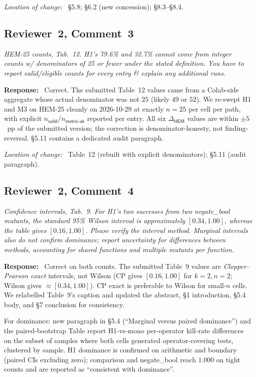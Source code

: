\documentclass[11pt,a4paper]{article}
\newenvironment{reviewerquote}
  {\begin{tcolorbox}[colback=black!5, colframe=black!15, boxrule=0.3pt,
                     arc=1pt, left=6pt, right=6pt, top=3pt, bottom=3pt,
                     breakable]\itshape\small}
  {\end{tcolorbox}}
\newcommand{\rcomment}[2]{\subsection*{Reviewer~#1, Comment~#2}}
\newcommand{\response}{\noindent\textbf{Response:}\ }
\newcommand{\loc}{\par\smallskip\noindent\textit{Location of change:}\ }
\begin{document}
\loc{} \S5.8; \S6.2 (new concession); \S8.3--\S8.4.

\rcomment{2}{3}

\begin{reviewerquote}
HEM-25 counts, Tab.\ 12. H1's 79.6\% and 32.7\% cannot come from integer counts w/ denominators of 25 or fewer under the stated definition. You have to report valid/eligible counts for every entry \& explain any additional runs.
\end{reviewerquote}

\response{}
Correct. The submitted Table~12 values came from a Colab-side aggregate whose actual denominator was not $25$ (likely $49$ or $52$). We re-swept H1 and M3 on HEM-25 cleanly on 2026-10-29 at exactly $n = 25$ per cell per path, with explicit $n_{\textsf{valid}} / n_{\textsf{metric-ok}}$ reported per entry. All six $\Delta_{\textsf{HEM}}$ values are within $\pm 5$~pp of the submitted version; the correction is denominator-honesty, not finding-reversal. \S5.11 contains a dedicated audit paragraph.

\loc{} Table~12 (rebuilt with explicit denominators); \S5.11 (audit paragraph).

\rcomment{2}{4}

\begin{reviewerquote}
Confidence intervals, Tab.\ 9. For H1's two successes from two negate\_bool mutants, the standard 95\% Wilson interval is approximately $[0.34, 1.00]$, whereas the table gives $[0.16, 1.00]$. Please verify the interval method. Marginal intervals also do not confirm dominance; report uncertainty for differences between methods, accounting for shared functions and multiple mutants per function.
\end{reviewerquote}

\response{}
Correct on both counts. The submitted Table~9 values are \emph{Clopper--Pearson exact} intervals, not Wilson (CP gives $[0.16, 1.00]$ for $k = 2, n = 2$; Wilson gives $\approx [0.34, 1.00]$). CP exact is preferable to Wilson for small-$n$ cells. We relabelled Table~9's caption and updated the abstract, \S1 introduction, \S5.4 body, and \S7 conclusion for consistency.

For dominance: new paragraph in \S5.4 (``Marginal versus paired dominance'') and the paired-bootstrap Table report H1-vs-mono per-operator kill-rate differences on the subset of samples where both cells generated operator-covering tests, clustered by sample. H1 dominance is confirmed on arithmetic and boundary (paired CIs excluding zero); comparison and negate\_bool reach $1.000$ on tight counts and are reported as ``consistent with dominance''.
\end{document}
